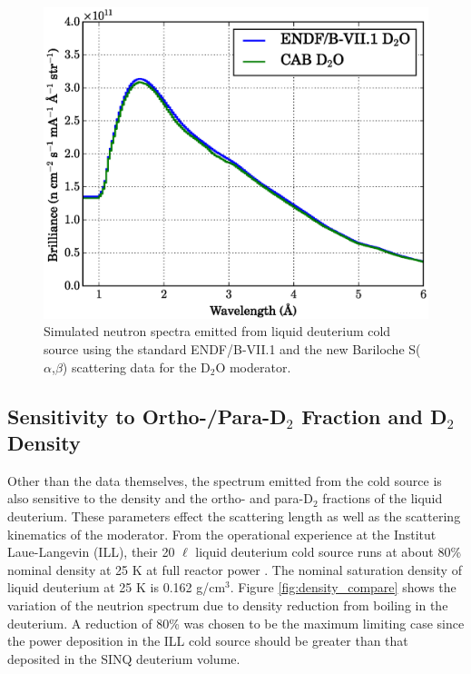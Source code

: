 \documentclass[5p,12pt]{elsarticle}
\begin{document}
\begin{figure}[h!] 
  \centering
    \includegraphics[width=\columnwidth]{graphics/data_compare_d2o.eps}
     \caption{Simulated neutron spectra emitted from liquid deuterium cold source using the standard ENDF/B-VII.1 and the new Bariloche S($\alpha$,$\beta$) scattering data for the D$_2$O moderator.   \label{fig:data_compare_d2o}}
\end{figure}

%
%
%
%
%

\subsection{Sensitivity to Ortho-/Para-D$_2$ Fraction and D$_2$ Density}
\label{subsec:frac_den}

Other than the data themselves, the spectrum emitted from the cold source is also sensitive to the density and the ortho- and para-D$_2$ fractions of the liquid deuterium.  These parameters effect the scattering length as well as the scattering kinematics of the moderator.  From the operational experience at the Institut Laue-Langevin (ILL), their 20 $\ell$ liquid deuterium cold source runs at about 80\% nominal density at 25 K at full reactor power \cite{ill_cns}. The nominal saturation density of liquid deuterium at 25 K is 0.162 g/cm$^3$\cite{bnl_cryo}.  Figure \ref{fig:density_compare} shows the variation of the neutrion spectrum due to density reduction from boiling in the deuterium.  A reduction of 80\% was chosen to be the maximum limiting case since the power deposition in the ILL cold source should be greater than that deposited in the SINQ deuterium volume.
\end{document}
